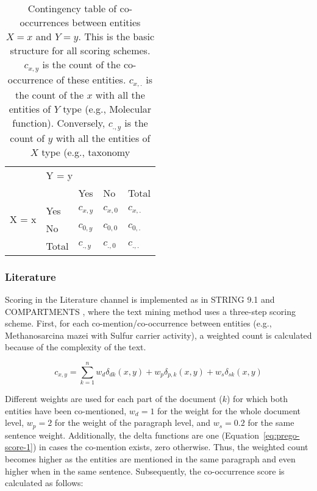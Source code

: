 \begin{table}[ht]
   \centering
   \begin{tabular}{c|llll}
    & \multicolumn{4}{l}{Y = y} \\ \cline{2-5} 
   \multirow{4}{*}{X = x} &  & Yes & No & Total \\ \cline{3-5} 
    & \multicolumn{1}{l|}{Yes} & $c_{x,y}$ & $c_{x,0}$ & $c_{x,.}$ \\
    & \multicolumn{1}{l|}{No} & $c_{0,y}$ & $c_{0,0}$ & $c_{0,.}$ \\
    & \multicolumn{1}{l|}{Total} & $c_{.,y}$ & $c_{.,0}$ & $c_{.,.}$
   \end{tabular}
   \caption[PREGO contingency table between two terms]{Contingency table of co-occurrences between entities $X = x$ and $Y = y$. 
   This is the basic structure for all scoring schemes. $c_{x,y}$ is the count of the co-occurrence of these entities. $c_{x,.}$ is the count of the $x$ with all the entities of $Y$ type (e.g., Molecular function). Conversely, $c_{.,y}$ is the count of $y$ with all the entities of $X$ type (e.g., taxonomy}
   \label{table:pregoA1}
\end{table}


\subsubsection{Literature}

Scoring in the Literature channel is implemented as in STRING 9.1 \parencite{franceschini2012string} and COMPARTMENTS \parencite{binder2014compartments}, where the text mining method uses a three-step scoring scheme. 
First, for each co-mention/co-occurrence between entities (e.g., Methanosarcina mazei with Sulfur carrier activity), a weighted count is calculated because of the complexity of the text.  


\begin{equation}
   c_{x,y} = \sum_{k=1}^{n}{w_d \delta_{dk}(x,y) +w_p \delta_{p,k}(x,y) + w_s \delta_{sk}(x,y)}
   \label{eq:prego-score-1}
\end{equation}



Different weights are used for each part of the document ($k$) for which both entities have been co-mentioned, $w_d = 1$ for the weight for the whole document level, $w_p = 2$ for the weight of the paragraph level, and $w_s = 0.2$ for the same sentence weight. 
Additionally, the delta functions are one (Equation~\ref{eq:prego-score-1}) in cases the co-mention exists, zero otherwise. Thus, the weighted count becomes higher as the entities are mentioned in the same paragraph and even higher when in the same sentence.
Subsequently, the co-occurrence score is calculated as follows:

